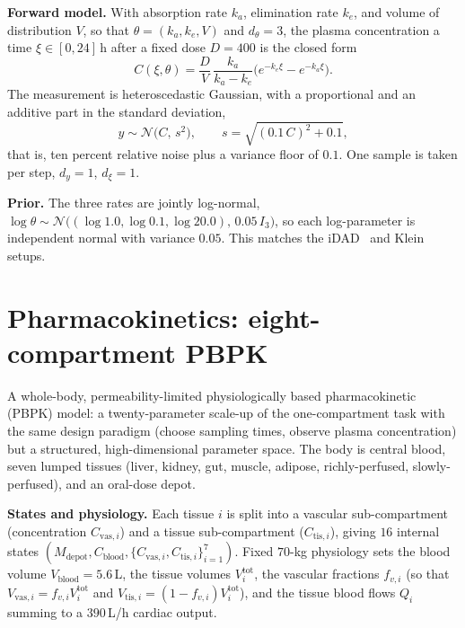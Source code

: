\textbf{Forward model.} With absorption rate $k_a$, elimination rate $k_e$, and volume of
distribution $V$, so that $\theta=(k_a,k_e,V)$ and $d_\theta=3$, the plasma concentration
a time $\xi\in[0,24]$\,h after a fixed dose $D=400$ is the closed form
\[
C(\xi,\theta)=\frac{D}{V}\,\frac{k_a}{k_a-k_e}\big(e^{-k_e\xi}-e^{-k_a\xi}\big).
\]
The measurement is heteroscedastic Gaussian, with a proportional and an additive part in
the standard deviation,
\[
y\sim\mathcal N\!\big(C,\,s^2\big),\qquad s=\sqrt{(0.1\,C)^2+0.1},
\]
that is, ten percent relative noise plus a variance floor of $0.1$. One sample is taken
per step, $d_y=1$, $d_\xi=1$.

\textbf{Prior.} The three rates are jointly log-normal,
$\log\theta\sim\mathcal N\big((\log 1.0,\log 0.1,\log 20.0),\,0.05\,I_3\big)$, so each
log-parameter is independent normal with variance $0.05$. This matches the
iDAD~\citep{ivanova2021implicit} and Klein~\citep{klein2026supercharging} setups.

\section{Pharmacokinetics: eight-compartment PBPK}
A whole-body, permeability-limited physiologically based pharmacokinetic (PBPK) model: a
twenty-parameter scale-up of the one-compartment task with the same design paradigm
(choose sampling times, observe plasma concentration) but a structured, high-dimensional
parameter space. The body is central blood, seven lumped tissues (liver, kidney, gut,
muscle, adipose, richly-perfused, slowly-perfused), and an oral-dose depot.

\textbf{States and physiology.} Each tissue $i$ is split into a vascular sub-compartment
(concentration $C_{\mathrm{vas},i}$) and a tissue sub-compartment ($C_{\mathrm{tis},i}$),
giving $16$ internal states
$(M_{\mathrm{depot}},C_{\mathrm{blood}},\{C_{\mathrm{vas},i},C_{\mathrm{tis},i}\}_{i=1}^7)$.
Fixed $70$-kg physiology sets the blood volume $V_{\mathrm{blood}}=5.6$\,L, the tissue
volumes $V^{\mathrm{tot}}_i$, the vascular fractions $f_{v,i}$ (so that
$V_{\mathrm{vas},i}=f_{v,i}V^{\mathrm{tot}}_i$ and
$V_{\mathrm{tis},i}=(1-f_{v,i})V^{\mathrm{tot}}_i$), and the tissue blood flows $Q_i$
summing to a $390$\,L/h cardiac output.

